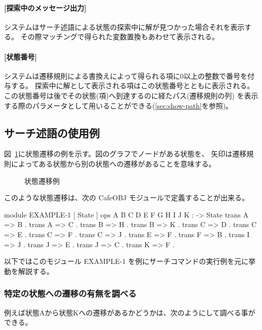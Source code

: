 \documentclass{article}
\begin{document}
\paragraph{[探索中のメッセージ出力]}
システムはサーチ述語による状態の探索中に解が見つかった場合それを表示する。
その際マッチングで得られた変数置換もあわせて表示される。

\paragraph{[状態番号]}
システムは遷移規則による書換えによって得られる項に0以上の整数で番号を付与する。
探索中に解として表示される項はこの状態番号とともに表示される。
この状態番号は後でその状態(項)へ到達するのに経たパス(遷移規則の列) を表示する際のパラメータとして用いることができる(\ref{sec:show-path}を参照)。

\subsection{サーチ述語の使用例}
\label{sec:search-example-1}

図~\ref{fig:dfs2}に状態遷移の例を示す。図のグラフでノードがある状態を、
矢印は遷移規則によってある状態から別の状態への遷移があることを意味する。

\begin{figure}[htbp]
  \begin{center}
    
    \caption{{状態遷移例}}
    \label{fig:dfs2}
  \end{center}
\end{figure}

このような状態遷移は、次の CafeOBJ モジュールで定義することが出来る。

\begin{simplev}
module EXAMPLE-1 {
  [ State ]
  ops A B C D E F G H I J K : -> State
  trans A => B .
  trans A => C .
  trans B => H .
  trans B => K .
  trans C => D .
  trans C => E .
  trans C => F .
  trans C => J .
  trans E => F .
  trans F => B .
  trans I => J .
  trans J => E .
  trans J => C .
  trans K => F .
}
\end{simplev}
以下ではこのモジュール EXAMPLE-1 を例にサーチコマンドの実行例を元に挙動を解説する。

\subsubsection{特定の状態への遷移の有無を調べる}
例えば状態Aから状態Kへの遷移があるかどうかは、次のようにして調べる事ができる。
\end{document}
